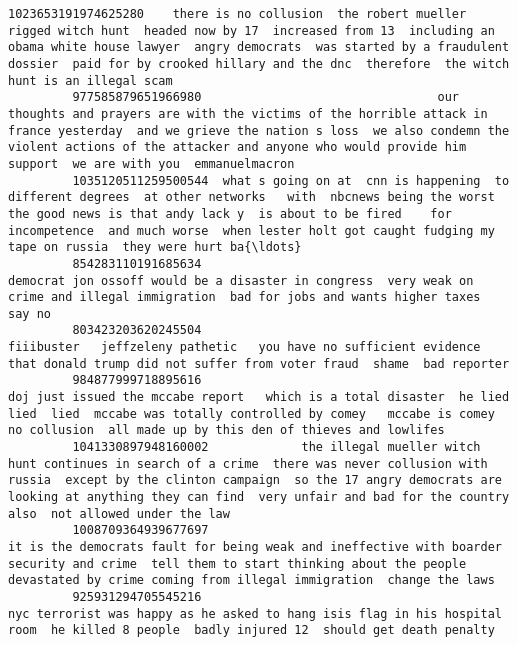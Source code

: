 \documentclass[11pt]{article}
\begin{document}
\begin{Verbatim}[commandchars=\\\{\}]
         1023653191974625280    there is no collusion  the robert mueller rigged witch hunt  headed now by 17  increased from 13  including an obama white house lawyer  angry democrats  was started by a fraudulent dossier  paid for by crooked hillary and the dnc  therefore  the witch hunt is an illegal scam    
         977585879651966980                                 our thoughts and prayers are with the victims of the horrible attack in france yesterday  and we grieve the nation s loss  we also condemn the violent actions of the attacker and anyone who would provide him support  we are with you  emmanuelmacron    
         1035120511259500544  what s going on at  cnn is happening  to different degrees  at other networks   with  nbcnews being the worst  the good news is that andy lack y  is about to be fired    for incompetence  and much worse  when lester holt got caught fudging my tape on russia  they were hurt ba{\ldots}   
         854283110191685634                                                                                                                                              democrat jon ossoff would be a disaster in congress  very weak on crime and illegal immigration  bad for jobs and wants higher taxes  say no   
         803423203620245504                                                                                                                                                fiiibuster   jeffzeleny pathetic   you have no sufficient evidence that donald trump did not suffer from voter fraud  shame  bad reporter    
         984877999718895616                                                                             doj just issued the mccabe report   which is a total disaster  he lied  lied  lied  mccabe was totally controlled by comey   mccabe is comey   no collusion  all made up by this den of thieves and lowlifes    
         1041330897948160002             the illegal mueller witch hunt continues in search of a crime  there was never collusion with russia  except by the clinton campaign  so the 17 angry democrats are looking at anything they can find  very unfair and bad for the country  also  not allowed under the law    
         1008709364939677697                                                                             it is the democrats fault for being weak and ineffective with boarder security and crime  tell them to start thinking about the people devastated by crime coming from illegal immigration  change the laws    
         925931294705545216                                                                                                                                               nyc terrorist was happy as he asked to hang isis flag in his hospital room  he killed 8 people  badly injured 12  should get death penalty    

\end{Verbatim}
\end{document}
